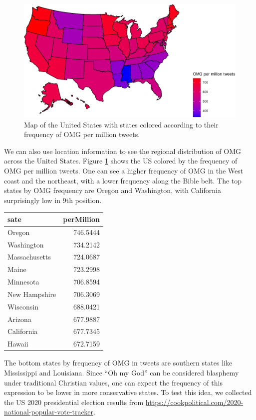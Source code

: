 \documentclass[]{article}
\begin{document}
\begin{figure}

{\centering \includegraphics{Friends_HPS_pdf_files/figure-latex/twitterstates-1} 

}

\caption{Map of the United States with states colored according to their frequency of OMG per million tweets.}\label{fig:twitterstates}
\end{figure}

We can also use location information to see the regional distribution of OMG across the United States. Figure \ref{fig:twitterstates} shows the US colored by the frequency of OMG per million tweets. One can see a higher frequency of OMG in the West coast and the northeast, with a lower frequency along the Bible belt. The top states by OMG frequency are Oregon and Washington, with California surprisingly low in 9th position.

\begin{tabular}{l|r}
\hline
sate & perMillion\\
\hline
Oregon & 746.5444\\
\hline
Washington & 734.2142\\
\hline
Massachusetts & 724.0687\\
\hline
Maine & 723.2998\\
\hline
Minnesota & 706.8594\\
\hline
New Hampshire & 706.3069\\
\hline
Wisconsin & 688.0421\\
\hline
Arizona & 677.9887\\
\hline
California & 677.7345\\
\hline
Hawaii & 672.7159\\
\hline
\end{tabular}

The bottom states by frequency of OMG in tweets are southern states like Mississippi and Louisiana. Since ``Oh my God'' can be considered blasphemy under traditional Christian values, one can expect the frequency of this expression to be lower in more conservative states. To test this idea, we collected the US 2020 presidential election results from \url{https://cookpolitical.com/2020-national-popular-vote-tracker}.
\end{document}
